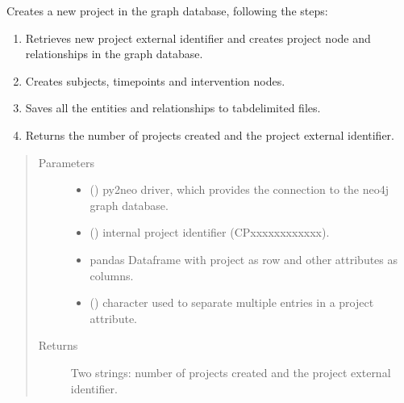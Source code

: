 \documentclass[letterpaper,10pt,english]{sphinxmanual}
\begin{document}
\begin{fulllineitems}
\label{\detokenize{_autosummary/report_manager.apps:report_manager.apps.projectCreation.create_new_project}}
Creates a new project in the graph database, following the steps:
\begin{enumerate}
%
\item {} 
Retrieves new project external identifier and creates project node and relationships in the graph database.

\item {} 
Creates subjects, timepoints and intervention nodes.

\item {} 
Saves all the entities and relationships to tab\sphinxhyphen{}delimited files.

\item {} 
Returns the number of projects created and the project external identifier.

\end{enumerate}
\begin{quote}\begin{description}
\item[{Parameters}] \leavevmode\begin{itemize}
\item {} 
 () \textendash{} py2neo driver, which provides the connection to the neo4j graph database.

\item {} 
 () \textendash{} internal project identifier (CPxxxxxxxxxxxx).

\item {} 
 \textendash{} pandas Dataframe with project as row and other attributes as columns.

\item {} 
 () \textendash{} character used to separate multiple entries in a project attribute.

\end{itemize}

\item[{Returns}] \leavevmode
Two strings: number of projects created and the project external identifier.

\end{description}\end{quote}

\end{fulllineitems}
\end{document}
